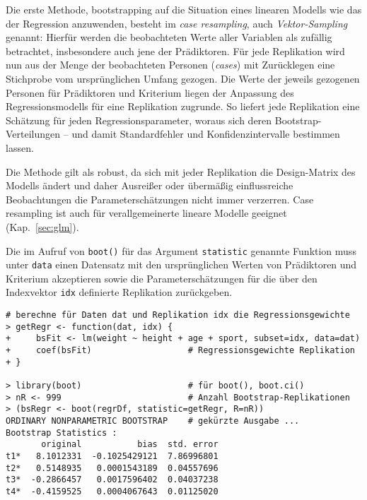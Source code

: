 Die erste Methode, bootstrapping auf die Situation eines linearen Modells wie das der Regression anzuwenden, besteht im \emph{case resampling}, auch \emph{Vektor-Sampling} genannt: Hierfür werden die beobachteten Werte aller Variablen als zufällig betrachtet, insbesondere auch jene der Prädiktoren. Für jede Replikation wird nun aus der Menge der beobachteten Personen (\emph{cases}) mit Zurücklegen eine Stichprobe vom ursprünglichen Umfang gezogen. Die Werte der jeweils gezogenen Personen für Prädiktoren und Kriterium liegen der Anpassung des Regressionsmodells für eine Replikation zugrunde. So liefert jede Replikation eine Schätzung für jeden Regressionsparameter, woraus sich deren Bootstrap-Verteilungen -- und damit Standardfehler und Konfidenzintervalle bestimmen lassen.

Die Methode gilt als robust, da sich mit jeder Replikation die Design-Matrix des Modells ändert und daher Ausreißer oder übermäßig einflussreiche Beobachtungen die Parameterschätzungen nicht immer verzerren. Case resampling ist auch für verallgemeinerte lineare Modelle geeignet (Kap.\ \ref{sec:glm}).

Die im Aufruf von \lstinline!boot()! für das Argument \lstinline!statistic! genannte Funktion muss unter \lstinline!data! einen Datensatz mit den ursprünglichen Werten von Prädiktoren und Kriterium akzeptieren sowie die Parameterschätzungen für die über den Indexvektor \lstinline!idx! definierte Replikation zurückgeben.
\begin{lstlisting}
# berechne für Daten dat und Replikation idx die Regressionsgewichte
> getRegr <- function(dat, idx) {
+     bsFit <- lm(weight ~ height + age + sport, subset=idx, data=dat)
+     coef(bsFit)                   # Regressionsgewichte Replikation
+ }

> library(boot)                     # für boot(), boot.ci()
> nR <- 999                         # Anzahl Bootstrap-Replikationen
> (bsRegr <- boot(regrDf, statistic=getRegr, R=nR))
ORDINARY NONPARAMETRIC BOOTSTRAP    # gekürzte Ausgabe ...
Bootstrap Statistics :
       original           bias  std. error
t1*   8.1012331  -0.1025429121  7.86996801
t2*   0.5148935   0.0001543189  0.04557696
t3*  -0.2866457   0.0017596402  0.04037238
t4*  -0.4159525   0.0004067643  0.01125020
\end{lstlisting}

